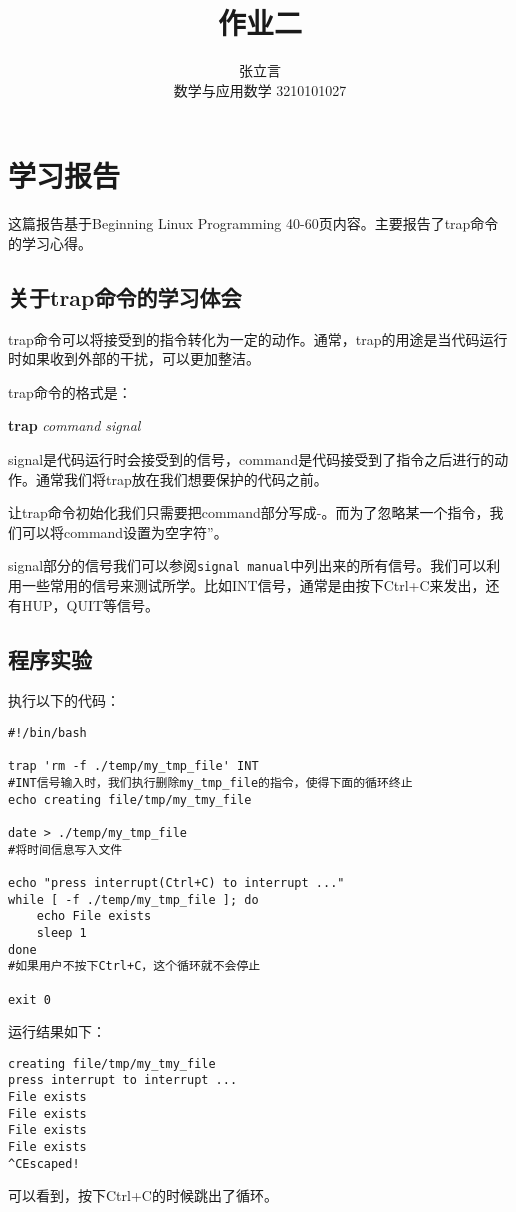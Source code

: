 \documentclass{ctexart}
\title{作业二}
\author{张立言 \\ 数学与应用数学 3210101027}
\begin{document}
\section{学习报告}
这篇报告基于Beginning Linux Programming 40-60页内容。主要报告了trap命令的学习心得。

\subsection{关于trap命令的学习体会}
trap命令可以将接受到的指令转化为一定的动作。通常，trap的用途是当代码运行时如果收到外部的干扰，可以更加整洁。

trap命令的格式是：

\textbf{trap}{} \textit{command signal}

signal是代码运行时会接受到的信号，command是代码接受到了指令之后进行的动作。通常我们将trap放在我们想要保护的代码之前。

让trap命令初始化我们只需要把command部分写成-。而为了忽略某一个指令，我们可以将command设置为空字符''。

signal部分的信号我们可以参阅\verb|signal manual|中列出来的所有信号。我们可以利用一些常用的信号来测试所学。比如INT信号，通常是由按下Ctrl+C来发出，还有HUP，QUIT等信号。

\subsection{程序实验}
执行以下的代码：
\begin{verbatim}
#!/bin/bash

trap 'rm -f ./temp/my_tmp_file' INT
#INT信号输入时，我们执行删除my_tmp_file的指令，使得下面的循环终止
echo creating file/tmp/my_tmy_file

date > ./temp/my_tmp_file
#将时间信息写入文件

echo "press interrupt(Ctrl+C) to interrupt ..."
while [ -f ./temp/my_tmp_file ]; do
    echo File exists
    sleep 1
done
#如果用户不按下Ctrl+C，这个循环就不会停止

exit 0
\end{verbatim}
运行结果如下：
\begin{verbatim}
creating file/tmp/my_tmy_file
press interrupt to interrupt ...
File exists
File exists
File exists
File exists
^CEscaped!
\end{verbatim}
可以看到，按下Ctrl+C的时候跳出了循环。
\end{document}
